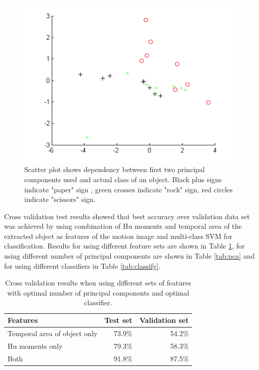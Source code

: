 

\begin{figure}
\begin{center}
\includegraphics[width=110mm]{paclassplot.png}
\caption{Scatter plot shows dependency between first two principal components used and actual class of an object. Black plus signs indicate "paper" sign , green crosses indicate "rock" sign, red circles indicate "scissors" sign. }
\label{fig:paclassplot}
\end{center}
\end{figure}

Cross validation test results showed that best accuracy over validation data set was achieved by using combination of Hu moments and temporal area of the extracted object as features of the motion image and multi-class SVM for classification. Results for using different feature sets are shown in Table \ref{tab:features}, for using different number of principal components are shown in Table \ref{tab:pca} and for using different classifiers in Table \ref{tab:classify}.

\begin{table}
\begin{center}
\begin{tabular}{| l | r | r |}
\hline
Features & Test set & Validation set \\ \hline
Temporal area of object only & 73.9\% & 54.2\% \\
Hu moments only & 79.3\% & 58.3\% \\
Both & 91.8\% & 87.5\% \\
\hline
\end{tabular}
\end{center}
\caption{Cross validation results when using different sets of features with optimal number of principal components and optimal classifier.}
\label{tab:features}
\end{table}


